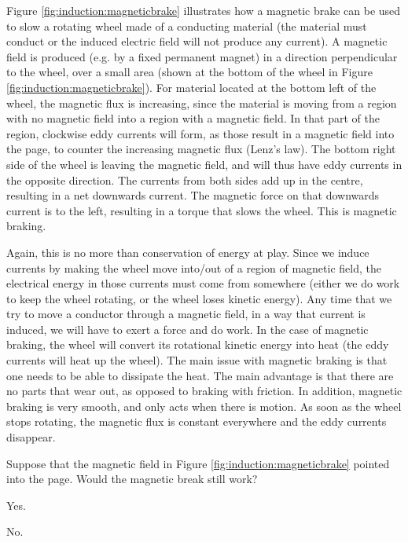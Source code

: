 Figure \ref{fig:induction:magneticbrake} illustrates how a magnetic brake can be used to slow a rotating wheel made of a conducting material (the material must conduct or the induced electric field will not produce any current). A magnetic field is produced (e.g. by a fixed permanent magnet) in a direction perpendicular to the wheel, over a small area (shown at the bottom of the wheel in Figure \ref{fig:induction:magneticbrake}).
For material located at the bottom left of the wheel, the magnetic flux is increasing, since the material is moving from a region with no magnetic field into a region with a magnetic field. In that part of the region, clockwise eddy currents will form, as those result in a magnetic field into the page, to counter the increasing magnetic flux (Lenz's law). The bottom right side of the wheel is leaving the magnetic field, and will thus have eddy currents in the opposite direction. The currents from both sides add up in the centre, resulting in a net downwards current. The magnetic force on that downwards current is to the left, resulting in a torque that slows the wheel. This is magnetic braking.

Again, this is no more than conservation of energy at play. Since we induce currents by making the wheel move into/out of a region of magnetic field, the electrical energy in those currents must come from somewhere (either we do work to keep the wheel rotating, or the wheel loses kinetic energy). Any time that we try to move a conductor through a magnetic field, in a way that current is induced, we will have to exert a force and do work. In the case of magnetic braking, the wheel will convert its rotational kinetic energy into heat (the eddy currents will heat up the wheel). The main issue with magnetic braking is that one needs to be able to dissipate the heat. The main advantage is that there are no parts that wear out, as opposed to braking with friction. In addition, magnetic braking is very smooth, and only acts when there is motion. As soon as the wheel stops rotating, the magnetic flux is constant everywhere and the eddy currents disappear.

\begin{checkpoint}{}
	\begin{MCquestion}{Suppose that the magnetic field in Figure \ref{fig:induction:magneticbrake} pointed into the page. Would the magnetic break still work?}
		\item Yes. \correct
		\item No.
	\end{MCquestion}
\end{checkpoint}

